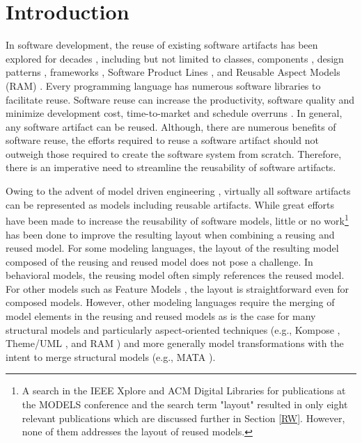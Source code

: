 \section{Introduction}\label{Introduction}
In software development, the reuse of existing software artifacts has been explored for decades \cite{mussbacher2013vision,krueger1992software,nato}, including but not limited to classes, components \cite{harsh2006component}, design patterns \cite{gangoffour}, frameworks \cite{johnson1997frameworks}, Software Product Lines \cite{pohl2005software}, and Reusable Aspect Models (RAM) \cite{kienzle2009aspect}. Every programming language has numerous software libraries to facilitate reuse. Software reuse can increase the productivity, software quality and minimize development cost, time-to-market and schedule overruns \cite{kim1998software}.  In general, any software artifact can be reused. Although, there are numerous benefits of software reuse, the efforts required to reuse a software artifact should not outweigh those required to create the software system from scratch. Therefore, there is an imperative need to streamline the reusability of software artifacts.

Owing to the advent of model driven engineering \cite{brambilla2012model, schmidt}, virtually all software artifacts can be represented as models including reusable artifacts. While great efforts have been made to increase the reusability of software models, little or no work\footnote{A search in the IEEE Xplore and ACM Digital Libraries for publications at the MODELS conference and the search term "layout"  resulted in only eight relevant publications which are discussed further in Section \ref{RW}. However, none of them addresses the layout of reused models.}\label{f1} has been done to improve the resulting layout when combining a reusing and reused model. For some modeling languages, the layout of the resulting model composed of the reusing and reused model does not pose a challenge. In behavioral models, the reusing model often simply references the reused model. For other models such as Feature Models \cite{kang1990feature}, the layout is straightforward even for composed models. However, other modeling languages require the merging of model elements in the reusing and reused models as is the case for many structural models and particularly aspect-oriented techniques (e.g., Kompose \cite{komposeOnline}, Theme/UML \cite{themeuml}, and RAM \cite{kienzle2009aspect}) and more generally model transformations with the intent \cite{lucio2016model} to merge structural models (e.g., MATA \cite{mata}). 

